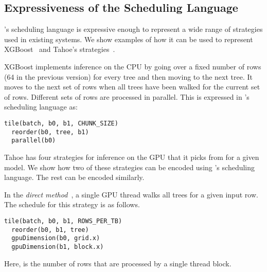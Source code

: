 
\subsection{Expressiveness of the Scheduling Language}
\Treebeard{}'s scheduling language is expressive enough to represent a wide range of
strategies used in existing systems. We show examples of how it can be used to 
represent XGBoost~\cite{XGBoost} and Tahoe's strategies~\cite{Tahoe}. 

XGBoost\cite{XGBoost} implements inference on the CPU by going 
over a fixed number of rows (64 in the previous version)
for every tree and then moving to the next tree. It moves to the 
next set of rows when all trees have been walked for the current 
set of rows. Different sets of rows are processed in parallel.
This is expressed in \Treebeard{}'s scheduling language as:
\begin{lstlisting}[style=c++]
  tile(batch, b0, b1, CHUNK_SIZE)
  reorder(b0, tree, b1)
  parallel(b0)
\end{lstlisting}

Tahoe\cite{Tahoe} has four strategies for inference on the GPU that it picks from for a given model. 
We show how two of these strategies can be encoded using \Treebeard{}'s scheduling language.
The rest can be encoded similarly. 

In the \emph{direct method}~\cite{Tahoe}, a single GPU thread walks all trees
for a given input row. The schedule for this strategy is as follows.
\begin{lstlisting}[style=c++]
  tile(batch, b0, b1, ROWS_PER_TB)
  reorder(b0, b1, tree)
  gpuDimension(b0, grid.x)
  gpuDimension(b1, block.x)
\end{lstlisting}
Here,  is the number of rows that are processed by a single thread block.

